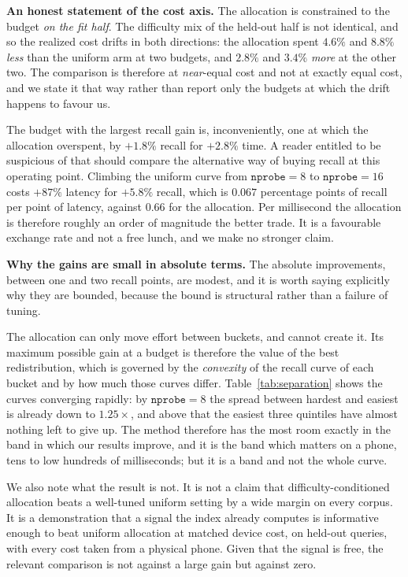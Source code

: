 \documentclass[journal]{IEEEtran}
\newcommand{\nprobe}{\texttt{nprobe}}
\begin{document}
\textbf{An honest statement of the cost axis.} The allocation is
constrained to the budget \emph{on the fit half}. The difficulty mix of the
held-out half is not identical, and so the realized cost drifts in both
directions: the allocation spent $4.6\%$ and $8.8\%$ \emph{less} than the
uniform arm at two budgets, and $2.8\%$ and $3.4\%$ \emph{more} at the
other two. The comparison is therefore at \emph{near}-equal cost and not at
exactly equal cost, and we state it that way rather than report only the
budgets at which the drift happens to favour us.

The budget with the largest recall gain is, inconveniently, one at which
the allocation overspent, by $+1.8\%$ recall for $+2.8\%$ time. A reader
entitled to be suspicious of that should compare the alternative way of
buying recall at this operating point. Climbing the uniform curve from
$\nprobe = 8$ to $\nprobe = 16$ costs $+87\%$ latency for $+5.8\%$ recall,
which is $0.067$ percentage points of recall per point of latency, against
$0.66$ for the allocation. Per millisecond the allocation is therefore
roughly an order of magnitude the better trade. It is a favourable exchange
rate and not a free lunch, and we make no stronger claim.

\textbf{Why the gains are small in absolute terms.} The absolute
improvements, between one and two recall points, are modest, and it is
worth saying explicitly why they are bounded, because the bound is
structural rather than a failure of tuning.

The allocation can only move effort between buckets, and cannot create it.
Its maximum possible gain at a budget is therefore the value of the best
redistribution, which is governed by the \emph{convexity} of the recall
curve of each bucket and by how much those curves differ.
Table~\ref{tab:separation} shows the curves converging rapidly: by $\nprobe
= 8$ the spread between hardest and easiest is already down to
$1.25\times$, and above that the easiest three quintiles have almost
nothing left to give up. The method therefore has the most room exactly in
the band in which our results improve, and it is the band which matters on
a phone, tens to low hundreds of milliseconds; but it is a band and not the
whole curve.

We also note what the result is not. It is not a claim that
difficulty-conditioned allocation beats a well-tuned uniform setting by a
wide margin on every corpus. It is a demonstration that a signal the index
already computes is informative enough to beat uniform allocation at
matched device cost, on held-out queries, with every cost taken from a
physical phone. Given that the signal is free, the relevant comparison is
not against a large gain but against zero.
\end{document}
